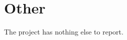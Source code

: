\newpage
\section{Other}
\label{section:other}

The project has nothing else to report.



\newpage
